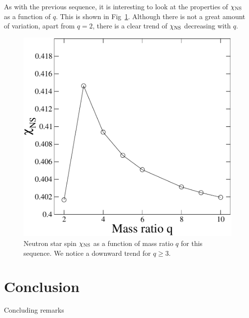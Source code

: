 As with the previous sequence, it is interesting to look at the
properties of $\chi_{\rm NS}$ as a function of $q$. This is shown in
Fig~\ref{fig:qchi}. Although there is not a great amount of variation,
apart from $q=2$, there is a clear trend of
$\chi_{\rm NS}$ decreasing with $q$. 
\begin{figure}
\includegraphics[width=0.95\columnwidth]{chap4/qchi}
\caption[$\chi_{\rm NS}$ as a function of mass ratio $q$.]{\label{fig:qchi}Neutron star spin $\chi_{\rm
    NS}$ as a function of mass ratio $q$ for this sequence. We notice
  a downward trend for $q \geq 3$. }
\end{figure}




\section{Conclusion}
Concluding remarks
